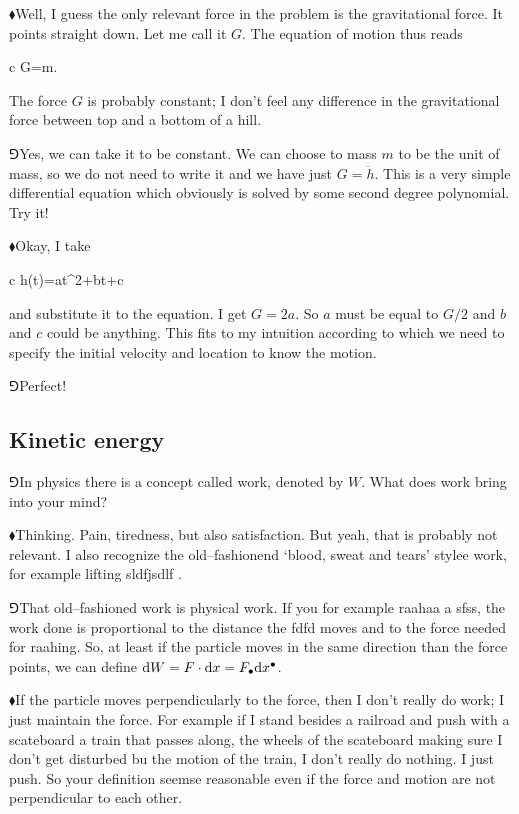 \documentclass[10pt,oneside%
]{memoir}
\newenvironment{eqna}{\begin{IEEEeqnarray*}{c}}{\end{IEEEeqnarray*}\ignorespacesafterend}
\newcommand{\dd}{\mathrm{d}}
\newcommand{\hea}{\(\blacklozenge\)\;}
\newcommand{\heb}{\(\Game\)\;}
\newcommand{\coa}{{\color{black}\bullet}}
\begin{document}
\hea Well, I guess the only relevant force in the problem is the gravitational force. It points straight down. Let me call it \(G\). The equation of motion thus reads
\begin{eqna}
    G=m.
\end{eqna}
The force \(G\) is probably constant; I don't feel any difference in the gravitational force between top and a bottom of a hill.

\heb Yes, we can take it to be constant. We can choose to mass \(m\) to be the unit of mass, so we do not need to write it and we have just \(G=\ddot{h}\). This is a very simple differential equation which obviously is solved by some second degree polynomial. Try it!

\hea Okay, I take
\begin{eqna}
    h(t)=at^2+bt+c
\end{eqna}
and substitute it to the equation. I get \(G=2a\). So \(a\) must be equal to \(G/2\) and \(b\) and \(c\) could be anything. This fits to my intuition according to which we need to specify the initial velocity and location to know the motion.

\heb Perfect!
\subsection{Kinetic energy}
\heb In physics there is a concept called work, denoted by \(W\). What does work bring into your mind?

\hea Thinking. Pain, tiredness, but also satisfaction. But yeah, that is probably not relevant. I also recognize the old--fashionend `blood, sweat and tears' stylee work, for example lifting sldfjsdlf .

\heb That old--fashioned work is physical work. If you for example raahaa a sfss, the work done is proportional to the distance the fdfd moves and to the force needed for raahing. So, at least if the particle moves in the same direction than the force points, we can define \(\dd W=F\cdot\dd x=F_\coa\dd x^\coa\).

\hea If the particle moves perpendicularly to the force, then I don't really do work; I just maintain the force. For example if I stand besides a railroad and push with a scateboard a train that passes along, the wheels of the scateboard making sure I don't get disturbed bu the motion of the train, I don't really do nothing. I just push. So your definition seemse reasonable even if the force and motion are not perpendicular to each other.
\end{document}
